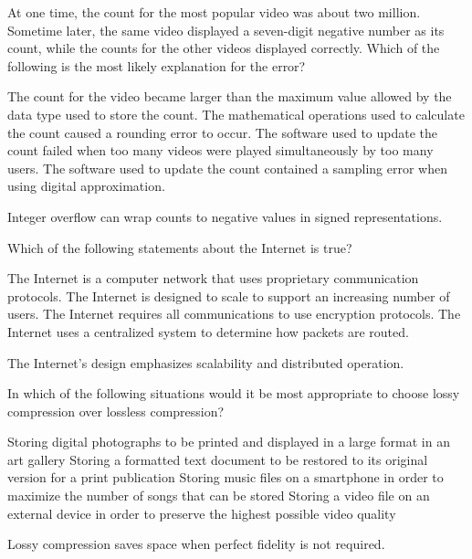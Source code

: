 At one time, the count for the most popular video was about two million. Sometime later, the same video displayed a seven-digit negative number as its count, while the counts for the other videos displayed correctly. Which of the following is the most likely explanation for the error?
\begin{choices}
  \CorrectChoice The count for the video became larger than the maximum value allowed by the data type used to store the count.
  \choice The mathematical operations used to calculate the count caused a rounding error to occur.
  \choice The software used to update the count failed when too many videos were played simultaneously by too many users.
  \choice The software used to update the count contained a sampling error when using digital approximation.
\end{choices}
\begin{solution}
  Integer overflow can wrap counts to negative values in signed representations.
\end{solution}






\question[5]
Which of the following statements about the Internet is true?
\begin{choices}
  \choice The Internet is a computer network that uses proprietary communication protocols.
  \CorrectChoice The Internet is designed to scale to support an increasing number of users.
  \choice The Internet requires all communications to use encryption protocols.
  \choice The Internet uses a centralized system to determine how packets are routed.
\end{choices}
\begin{solution}
  The Internet's design emphasizes scalability and distributed operation.
\end{solution}

\question[5]
In which of the following situations would it be most appropriate to choose lossy compression over lossless compression?
\begin{choices}
  \choice Storing digital photographs to be printed and displayed in a large format in an art gallery
  \choice Storing a formatted text document to be restored to its original version for a print publication
  \CorrectChoice Storing music files on a smartphone in order to maximize the number of songs that can be stored
  \choice Storing a video file on an external device in order to preserve the highest possible video quality
\end{choices}
\begin{solution}
  Lossy compression saves space when perfect fidelity is not required.
\end{solution}








